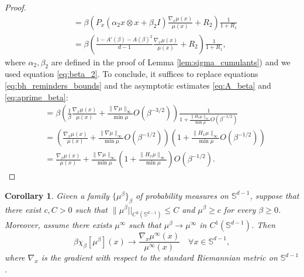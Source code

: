 \documentclass{article}
\numberwithin{theorem}{section}
\newtheorem{corollary}[theorem]{Corollary}
\begin{document}
\begin{proof}
\begin{align*}
        &=\beta\left(P_x (\alpha_2 x\otimes x+\beta_2 I ) \frac{\nabla_x \mu(x)}{\mu(x)}+R_2\right)\frac{1}{1+R_1}\\
        &=\beta\left(\frac{1-A'(\beta)-A(\beta)^2}{d-1} \frac{\nabla_x\mu(x)}{\mu(x)}+ R_2\right)\frac{1}{1+R_1},
    \end{align*}
where $\alpha_2,\beta_2$ are defined in the proof of Lemma \ref{lem:sigma_cumulants}) and we used equation \ref{eq:beta_2}. To conclude, it suffices to replace equations \ref{eq:bh_reminders_bounds} and the asymptotic estimates \ref{eq:A_beta} and \ref{eq:aprime_beta}:
\begin{align*}
    &=\beta\left(\frac{1}{\beta}\frac{\nabla_x\mu(x)}{\mu(x)} + \frac{\|\nabla\mu\|_\infty}{\min \mu} O(\beta^{-3/2})\right)\frac{1}{1+\frac{\|H_x\mu\|_\infty}{\min \mu} O(\beta^{-1/2})}\\
    &=\left(\frac{\nabla_x\mu(x)}{\mu(x)} + \frac{\|\nabla\mu\|_\infty}{\min \mu} O(\beta^{-1/2})\right)\left(1+\frac{\|H_x\mu\|_\infty}{\min \mu} O(\beta^{-1/2})\right) \\
    &=\frac{\nabla_x\mu(x)}{\mu(x)} + \frac{\|\nabla\mu\|_\infty}{\min \mu}\left(1+\frac{\|H_x\mu\|_\infty}{\min \mu}\right) O(\beta^{-1/2}).
\end{align*}

\end{proof}
\begin{corollary}
    \label{cor:bh_chi_conv}
    Given a family $\{\mu^\beta\}_\beta$ of probability measures on $\mathbb{S}^{d-1}$, suppose that there exist $c, C>0$ such that $\|\mu^\beta||_{C^2(\mathbb{S}^{d-1})}\leq C$ and $\mu^\beta\geq c$ for every $\beta\geq 0$. Moreover, assume there exists $\mu^\infty$ such that $\mu^\beta\to\mu^\infty$ in $C^1(\mathbb{S}^{d-1})$. Then
    $$
    \beta \chi_\beta[\mu^\beta](x)\to \frac{\nabla_x \mu^\infty(x)}{\mu^\infty(x)}\quad \forall x\in\mathbb{S}^{d-1},
    $$
    where $\nabla_x$ is the gradient with respect to the standard Riemannian metric on $\mathbb{S}^{d-1}$.
\end{corollary}
\end{document}
